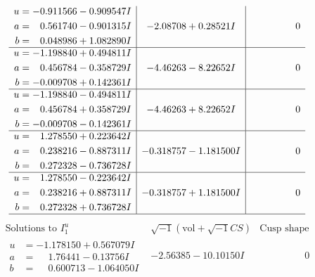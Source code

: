 \documentclass[1p]{elsarticle_modified}
\theoremstyle{definition}
\newcommand{\I}{\sqrt{-1}}
\begin{document}
$$\begin{array}{c|c|c}
\begin{aligned}
u &= -0.911566 - 0.909547 I \\
a &= \phantom{-}0.561740 - 0.901315 I \\
b &= \phantom{-}0.048986 + 1.082890 I\end{aligned}
 & -2.08708 + 0.28521 I & \phantom{-0.000000 } 0 \\ \hline\begin{aligned}
u &= -1.198840 + 0.494811 I \\
a &= \phantom{-}0.456784 - 0.358729 I \\
b &= -0.009708 + 0.142361 I\end{aligned}
 & -4.46263 - 8.22652 I & \phantom{-0.000000 } 0 \\ \hline\begin{aligned}
u &= -1.198840 - 0.494811 I \\
a &= \phantom{-}0.456784 + 0.358729 I \\
b &= -0.009708 - 0.142361 I\end{aligned}
 & -4.46263 + 8.22652 I & \phantom{-0.000000 } 0 \\ \hline\begin{aligned}
u &= \phantom{-}1.278550 + 0.223642 I \\
a &= \phantom{-}0.238216 - 0.887311 I \\
b &= \phantom{-}0.272328 - 0.736728 I\end{aligned}
 & -0.318757 - 1.181500 I & \phantom{-0.000000 } 0 \\ \hline\begin{aligned}
u &= \phantom{-}1.278550 - 0.223642 I \\
a &= \phantom{-}0.238216 + 0.887311 I \\
b &= \phantom{-}0.272328 + 0.736728 I\end{aligned}
 & -0.318757 + 1.181500 I & \phantom{-0.000000 } 0\\
 \hline 
 \end{array}$$\newpage$$\begin{array}{c|c|c}  
\text{Solutions to }I^u_{1}& \I (\text{vol} + \sqrt{-1}CS) & \text{Cusp shape}\\
 \hline 
\begin{aligned}
u &= -1.178150 + 0.567079 I \\
a &= \phantom{-}1.76441 - 0.13756 I \\
b &= \phantom{-}0.600713 - 1.064050 I\end{aligned}
 & -2.56385 - 10.10150 I & \phantom{-0.000000 } 0 \\ \hline\begin{aligned}

\end{aligned}
\end{array}$$
\end{document}
